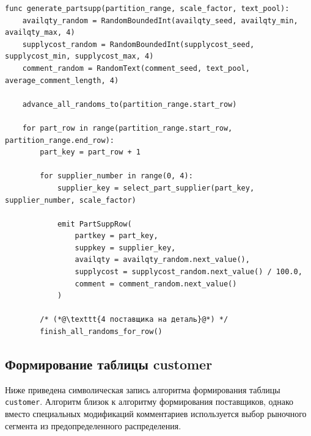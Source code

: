 \begin{lstlisting}[caption={Формирование таблицы partsupp}]
func generate_partsupp(partition_range, scale_factor, text_pool):
    availqty_random = RandomBoundedInt(availqty_seed, availqty_min, availqty_max, 4)
    supplycost_random = RandomBoundedInt(supplycost_seed, supplycost_min, supplycost_max, 4)
    comment_random = RandomText(comment_seed, text_pool, average_comment_length, 4)

    advance_all_randoms_to(partition_range.start_row)

    for part_row in range(partition_range.start_row, partition_range.end_row):
        part_key = part_row + 1

        for supplier_number in range(0, 4):
            supplier_key = select_part_supplier(part_key, supplier_number, scale_factor)

            emit PartSuppRow(
                partkey = part_key,
                suppkey = supplier_key,
                availqty = availqty_random.next_value(),
                supplycost = supplycost_random.next_value() / 100.0,
                comment = comment_random.next_value()
            )

        /* (*@\texttt{4 поставщика на деталь}@*) */
        finish_all_randoms_for_row()
\end{lstlisting}

\subsection{Формирование таблицы customer}

Ниже приведена символическая запись алгоритма формирования таблицы
\texttt{customer}. Алгоритм близок к алгоритму формирования поставщиков, однако
вместо специальных модификаций комментариев используется выбор рыночного
сегмента из предопределенного распределения.

